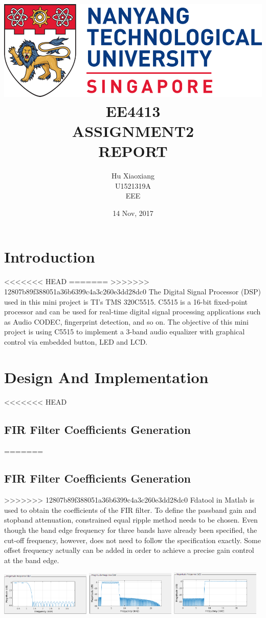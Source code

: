 \documentclass[titlepage]{article}
\author{Hu Xiaoxiang \\
U1521319A \\
EEE \\
}
\date{14 Nov, 2017 \\
}
\title{\includegraphics[width=\textwidth]{logo_ntu_new.png} \\
[5\baselineskip] EE4413 \\
ASSIGNMENT2 \\
REPORT \\
[5\baselineskip]}
\begin{document}
\maketitle
\tableofcontents

\newpage
{}

\section{Introduction}
<<<<<<< HEAD
\label{sec:orgc13b1c0}
=======
\label{sec:org42a17d1}
>>>>>>> 12807b89f388051a36b6399c4a3c260e3dd28dc0
The Digital Signal Processor (DSP) used in this mini project is TI's TMS
320C5515. C5515 is a 16-bit fixed-point processor and can be used for
real-time digital signal processing applications such as Audio CODEC,
fingerprint detection, and so on. The objective of this mini project is using
C5515 to implement a 3-band audio equalizer with graphical control via
embedded button, LED and LCD.

\section{Design And Implementation}
<<<<<<< HEAD
\label{sec:org518ddb6}
\subsection{FIR Filter Coefficients Generation}
\label{sec:org763ff48}
=======
\label{sec:org44bc1b6}
\subsection{FIR Filter Coefficients Generation}
\label{sec:org72621ab}
>>>>>>> 12807b89f388051a36b6399c4a3c260e3dd28dc0
Fdatool in Matlab is used to obtain the coefficients of the FIR filter. To
define the passband gain and stopband attenuation, constrained equal ripple
method needs to be chosen. Even though the band edge frequency for three
bands have already been specified, the cut-off frequency, however, does not
need to follow the specification exactly. Some offset frequency actually can
be added in order to achieve a precise gain control at the band edge.

\begin{center}
\includegraphics[width=0.32\textwidth]{lp_mag.png}
\includegraphics[width=0.32\textwidth]{bp_mag.png}
\includegraphics[width=0.32\textwidth]{hp_mag.png}
\end{center}
\end{document}
